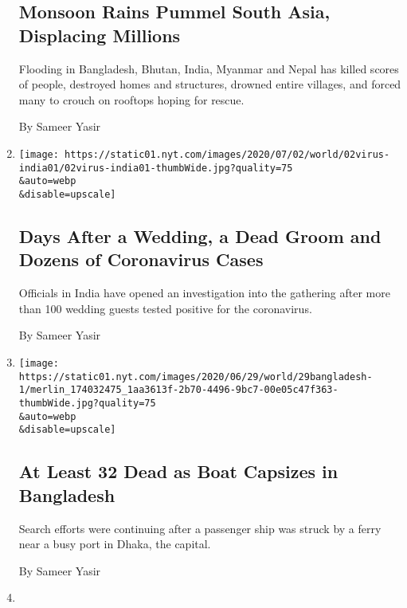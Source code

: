 \begin{enumerate}
{  \subsection{Monsoon Rains Pummel South Asia, Displacing
  Millions}\label{monsoon-rains-pummel-south-asia-displacing-millions}}

  Flooding in Bangladesh, Bhutan, India, Myanmar and Nepal has killed
  scores of people, destroyed homes and structures, drowned entire
  villages, and forced many to crouch on rooftops hoping for rescue.

  By Sameer Yasir
\item
  \href{/2020/07/02/world/asia/india-coronavirus-wedding-groom.html}{}

  \texttt{[image: https://static01.nyt.com/images/2020/07/02/world/02virus-india01/02virus-india01-thumbWide.jpg?quality=75\\\&auto=webp\\\&disable=upscale]}

  \hypertarget{days-after-a-wedding-a-dead-groom-and-dozens-of-coronavirus-cases}{%
  \subsection{Days After a Wedding, a Dead Groom and Dozens of
  Coronavirus
  Cases}\label{days-after-a-wedding-a-dead-groom-and-dozens-of-coronavirus-cases}}

  Officials in India have opened an investigation into the gathering
  after more than 100 wedding guests tested positive for the
  coronavirus.

  By Sameer Yasir
\item
  \href{/2020/06/29/world/asia/bangladesh-ferry-capsize.html}{}

  \texttt{[image: https://static01.nyt.com/images/2020/06/29/world/29bangladesh-1/merlin\_174032475\_1aa3613f-2b70-4496-9bc7-00e05c47f363-thumbWide.jpg?quality=75\\\&auto=webp\\\&disable=upscale]}

  \hypertarget{at-least-32-dead-as-boat-capsizes-in-bangladesh}{%
  \subsection{At Least 32 Dead as Boat Capsizes in
  Bangladesh}\label{at-least-32-dead-as-boat-capsizes-in-bangladesh}}

  Search efforts were continuing after a passenger ship was struck by a
  ferry near a busy port in Dhaka, the capital.

  By Sameer Yasir
\item
  \href{/2020/06/28/world/asia/india-skin-color-unilever.html}{}


\end{enumerate}
